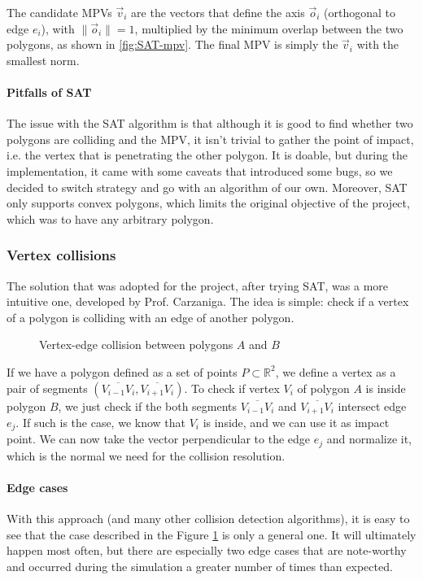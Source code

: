 The candidate MPVs $\vec v_i$ are the vectors that define the axis $\vec o_i$
(orthogonal to edge $e_i$), with $\| \vec o_i \| = 1$, multiplied by the minimum
overlap between the two polygons, as shown in \ref{fig:SAT-mpv}. The final MPV
is simply the $\vec v_i$ with the smallest norm.

\paragraph{Pitfalls of SAT} The issue with the SAT algorithm is that although it
is good to find whether two polygons are colliding and the MPV, it isn't trivial
to gather the point of impact, i.e. the vertex that is penetrating the other
polygon. It is doable, but during the implementation, it came with some caveats
that introduced some bugs, so we decided to switch strategy and go with an
algorithm of our own. Moreover, SAT only supports convex polygons, which limits
the original objective of the project, which was to have any arbitrary polygon.

\subsubsection{Vertex collisions}
\label{sub:vertex-collision}

The solution that was adopted for the project, after trying SAT, was a more
intuitive one, developed by Prof. Carzaniga. The idea is simple: check if a
vertex of a polygon is colliding with an edge of another polygon.

\begin{figure}[H]
	\centering
	\caption{Vertex-edge collision between polygons $A$ and $B$}
	\label{fig:vertex-edge}
\end{figure}

If we have a polygon defined as a set of points $P \subset \mathbb{R}^2$, we
define a vertex as a pair of segments $\left(\overline{V_{i-1}V_i},
	\overline{V_{i+1}V_i}\right)$. To check if vertex $V_i$ of polygon $A$ is inside
polygon $B$, we just check if the both segments $\overline{V_{i-1}V_i}$ and
$\overline{V_{i+1}V_i}$ intersect edge $e_j$. If such is the case, we know that
$V_i$ is inside, and we can use it as impact point. We can now take the vector
perpendicular to the edge $e_j$ and normalize it, which is the normal we need
for the collision resolution.


\paragraph{Edge cases} With this approach (and many other collision detection
algorithms), it is easy to see that the case described in the Figure
\ref{fig:vertex-edge} is only a general one. It will ultimately happen most
often, but there are especially two edge cases that are note-worthy and occurred
during the simulation a greater number of times than expected.

